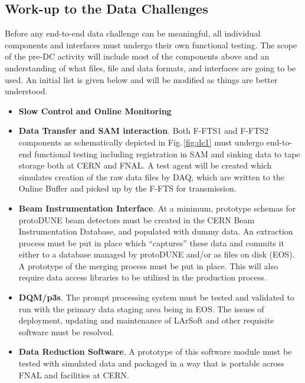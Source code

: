 \documentclass[pdftex,12pt,letter]{article}
\newcommand{\pd}{protoDUNE\xspace}
\begin{document}
\subsection{Work-up to the Data Challenges}
Before any end-to-end data challenge can be meaningful, all individual components and interfaces must undergo
their own functional testing. The scope of the pre-DC activity will include most of the components above and an understanding of what files, file and data formats, and interfaces are going to be used. An initial list is given below and will be modified as things are better understood.
\begin{itemize}

\item \textbf{Slow Control and Online Monitoring}

\item \textbf{Data Transfer and SAM interaction}.  Both F-FTS1 and F-FTS2 components as schematically depicted in Fig.\,\ref{fig:dc1}
must undergo end-to-end functional testing including registration in SAM and sinking data to tape storage both at CERN and FNAL. A test
agent will be created which simulates creation of the raw data files by DAQ, which are written to the Online Buffer and picked up
by the F-FTS for transmission.

\item \textbf{Beam Instrumentation Interface}. At a minimum, prototype schemas for \pd beam detectors must be created in
the CERN Beam Instrumentation Database, and populated with dummy data. An extraction process must be put in place which
``captures'' these data and commits it either to a database managed by \pd and/or as files on disk (EOS). A prototype
of the merging process must be put in place. This will also require data access libraries to be utilized in the production process.

\item  \textbf{DQM/p3s}. The prompt processing system must be tested and validated to run with the primary data
staging area being in EOS. The issues of deployment, updating and maintenance of LArSoft and other requisite software
must be resolved.

\item  \textbf{Data Reduction Software}.
A prototype of this software module must be tested with simulated data and packaged in a way that is portable across
FNAL and facilities at CERN.


\end{itemize}
\end{document}
